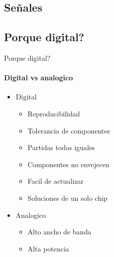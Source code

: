 \documentclass{beamer}
\begin{document}
  \begin{darkframes}
    \section{Señales}
    \subsection{Porque digital?}
    \begin{frame}{Porque digital?}
      \framesubtitle{Digital vs analogico}%
      \begin{itemize}
         \item{Digital}
            \begin{itemize}
               \item{Reproducibilidad}
               \item{Tolerancia de componentes}
               \item{Partidas todas iguales}
               \item{Componentes no envejecen}
               \item{Facil de actualizar}
               \item{Soluciones de un solo chip}
            \end{itemize}
         \item{Analogico}
            \begin{itemize}
               \item{Alto ancho de banda}
               \item{Alta potencia}
            \end{itemize}
      \end{itemize}
    \end{frame}

\end{darkframes}
\end{document}

